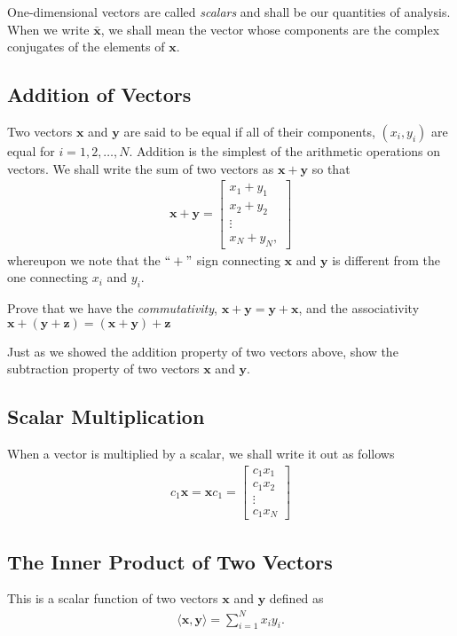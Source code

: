 One-dimensional vectors are called \textit{scalars} and shall be our quantities of analysis. When we write $\bar{\bm{x}}$, we shall mean the vector whose components are the complex conjugates of the elements of $\bm{x}$.

\subsection{Addition of Vectors}
%
Two vectors $\bm{x}$ and $\bm{y}$ are said to be equal if all of their components, $(x_i, y_i)$ are equal for $i=1,2,\ldots, N$. Addition is the simplest of the arithmetic operations on vectors. We shall write the sum of two vectors as $\bm{x} + \bm{y}$ so that 
%
\begin{align}
	\bm{x} + \bm{y} = \begin{bmatrix}
	x_1 + y_1 \\ x_2+y_2 \\ \vdots \\ x_N + y_N,
	\end{bmatrix}
\end{align}
% 
whereupon we note that the $``+"$ sign connecting $\bm{x}$ and $\bm{y}$ is different from the one connecting $x_i$ and $y_i$.

\begin{homework}
	Prove that we have the \textit{commutativity}, $\bm{x}+\bm{y} = \bm{y} + \bm{x}$, and the associativity $\bm{x} + \left(\bm{y}+\bm{z}\right) = \left(\bm{x} + \bm{y}\right)+\bm{z}$
\end{homework}
%
\begin{homework}
	Just as we showed the addition property of two vectors above, show the subtraction property of two vectors $\bm{x}$ and $\bm{y}$.
\end{homework}

\subsection{Scalar Multiplication}
When a vector is multiplied by a scalar, we shall write it out as follows
%
\begin{align}
	c_1 \bm{x} = \bm{x} c_1 = \begin{bmatrix}
	c_1 x_1 \\ c_1 x_2 \\ \vdots \\ c_1 x_N
	\end{bmatrix}
\end{align}
%
\subsection{The Inner Product of Two Vectors}
%
This is a scalar function of two vectors $\bm{x}$ and $\bm{y}$ defined as 
%
\begin{align}
	\langle \bm{x}, \bm{y} \rangle = \sum_{i=1}^{N} x_i y_i.
\end{align}


